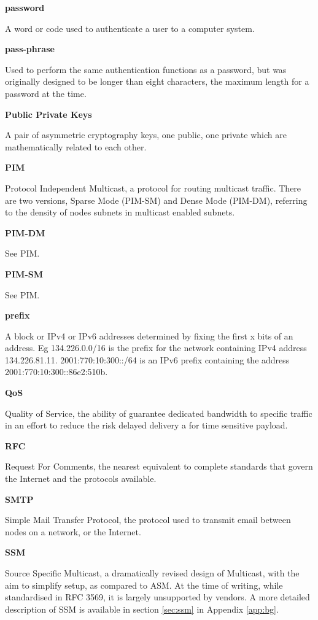 \textbf{password}

A word or code used to authenticate a user to a computer system.

\textbf{pass-phrase}

Used to perform the same authentication functions as a password, but was
originally designed to be longer than eight characters, the maximum
length for a password at the time.

\textbf{Public Private Keys}

A pair of asymmetric cryptography keys, one public, one private which 
are mathematically related to each other. 

\textbf{PIM}

Protocol Independent Multicast, a protocol for routing multicast
traffic. There are two versions, Sparse Mode (PIM-SM) and Dense Mode
(PIM-DM), referring to the density of nodes subnets in multicast 
enabled subnets.

\textbf{PIM-DM}

See PIM.

\textbf{PIM-SM}

See PIM.

\textbf{prefix}

A block or IPv4 or IPv6 addresses determined by fixing the first x bits
of an address. Eg 134.226.0.0/16 is the prefix for the network
containing IPv4 address 134.226.81.11. 2001:770:10:300::/64 is an IPv6
prefix containing the address 2001:770:10:300::86e2:510b. 

\textbf{QoS}

Quality of Service, the ability of guarantee dedicated bandwidth to
specific traffic in an effort to reduce the risk delayed delivery a for
time sensitive payload.

\textbf{RFC}

Request For Comments, the nearest equivalent to complete standards that
govern the Internet and the protocols available.

\textbf{SMTP}

Simple Mail Transfer Protocol, the protocol used to transmit email
between nodes on a network, or the Internet.

\textbf{SSM}

Source Specific Multicast, a dramatically revised design of Multicast,
with the aim to simplify setup, as compared to ASM. At the time of
writing, while standardised in RFC 3569, it is largely unsupported by
vendors. A more detailed description of SSM is available in section 
\ref{sec:ssm} in Appendix \ref{app:bg}.

